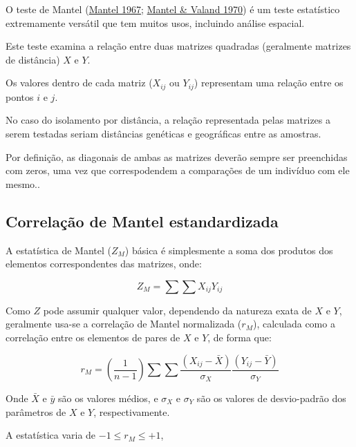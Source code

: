 \documentclass[
]{book}
\begin{document}
O teste de Mantel (\href{https://pubmed.ncbi.nlm.nih.gov/6018555}{Mantel 1967}; \href{https://doi.org/10.2307/2529108}{Mantel \& Valand 1970}) é um teste estatístico extremamente versátil que tem muitos usos, incluindo análise espacial.

Este teste examina a relação entre duas matrizes quadradas (geralmente matrizes de distância) \(X\) e \(Y\).

Os valores dentro de cada matriz (\(X_{ij}\) ou \(Y_{ij}\)) representam uma relação entre os pontos \(i\) e \(j\).

No caso do isolamento por distância, a relação representada pelas matrizes a serem testadas seriam distâncias genéticas e geográficas entre as amostras.

Por definição, as diagonais de ambas as matrizes deverão sempre ser preenchidas com zeros, uma vez que correspodendem a comparações de um indivíduo com ele mesmo..

\hypertarget{correlauxe7uxe3o-de-mantel-estandardizada}{%
\subsection{Correlação de Mantel estandardizada}\label{correlauxe7uxe3o-de-mantel-estandardizada}}

A estatística de Mantel (\(Z_M\)) básica é simplesmente a soma dos produtos dos elementos correspondentes das matrizes, onde:

\[Z_M = \sum\sum X_{ij}Y_{ij} \]

Como \(Z\) pode assumir qualquer valor, dependendo da natureza exata de \(X\) e \(Y\), geralmente usa-se a correlação de Mantel normalizada (\(r_M\)), calculada como a correlação entre os elementos de pares de \(X\) e \(Y\), de forma que:

\[r_M = \left( \frac{1}{n-1} \right) \sum \sum \frac{\left(X_{ij}-\bar{X}\right)}{\sigma_X}\frac{\left(Y_{ij}-\bar{Y}\right)}{\sigma_Y} \]

Onde
\(\bar{X}\) e \(\bar{y}\) são os valores médios, e
\({\sigma_X}\) e \({\sigma_Y}\) são os valores de desvio-padrão dos parâmetros de \(X\) e \(Y\), respectivamente.

A estatística varia de \(-1 \leq r_M \leq +1\),
\end{document}
